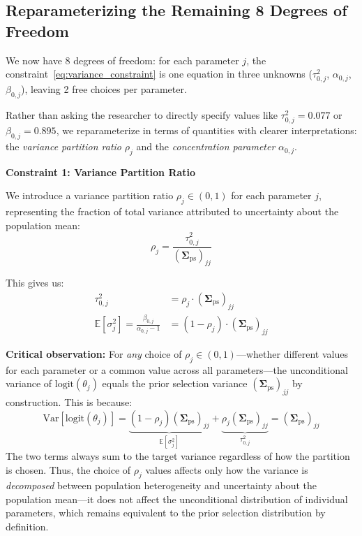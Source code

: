 \documentclass[11pt]{article}
\newcommand{\E}{\mathbb{E}}
\newcommand{\Var}{\text{Var}}
\begin{document}
\subsection{Reparameterizing the Remaining 8 Degrees of Freedom}

We now have 8 degrees of freedom: for each parameter $j$, the constraint~\eqref{eq:variance_constraint} is one equation in three unknowns ($\tau_{0,j}^2$, $\alpha_{0,j}$, $\beta_{0,j}$), leaving 2 free choices per parameter.

Rather than asking the researcher to directly specify values like $\tau_{0,j}^2 = 0.077$ or $\beta_{0,j} = 0.895$, we reparameterize in terms of quantities with clearer interpretations: the \textit{variance partition ratio} $\rho_j$ and the \textit{concentration parameter} $\alpha_{0,j}$.

\textbf{Constraint 1: Variance Partition Ratio}

We introduce a variance partition ratio $\rho_j \in (0, 1)$ for each parameter $j$, representing the fraction of total variance attributed to uncertainty about the population mean:
\begin{equation}
  \rho_j = \frac{\tau_{0,j}^2}{(\boldsymbol{\Sigma}_{\text{ps}})_{jj}}
  \label{eq:rho_def}
\end{equation}

This gives us:
\begin{align}
  \tau_{0,j}^2 &= \rho_j \cdot (\boldsymbol{\Sigma}_{\text{ps}})_{jj} \label{eq:tau_from_rho} \\
  \E[\sigma_j^2] = \frac{\beta_{0,j}}{\alpha_{0,j} - 1} &= (1 - \rho_j) \cdot (\boldsymbol{\Sigma}_{\text{ps}})_{jj} \label{eq:Esigma_from_rho}
\end{align}

\textbf{Critical observation:} For \textit{any} choice of $\rho_j \in (0, 1)$---whether different values for each parameter or a common value across all parameters---the unconditional variance of $\text{logit}(\theta_j)$ equals the prior selection variance $(\boldsymbol{\Sigma}_{\text{ps}})_{jj}$ by construction. This is because:
\[
  \Var[\text{logit}(\theta_j)] = \underbrace{(1 - \rho_j)(\boldsymbol{\Sigma}_{\text{ps}})_{jj}}_{\E[\sigma_j^2]} + \underbrace{\rho_j (\boldsymbol{\Sigma}_{\text{ps}})_{jj}}_{\tau_{0,j}^2} = (\boldsymbol{\Sigma}_{\text{ps}})_{jj}
\]
The two terms always sum to the target variance regardless of how the partition is chosen. Thus, the choice of $\rho_j$ values affects only how the variance is \textit{decomposed} between population heterogeneity and uncertainty about the population mean---it does not affect the unconditional distribution of individual parameters, which remains equivalent to the prior selection distribution by definition.
\end{document}
